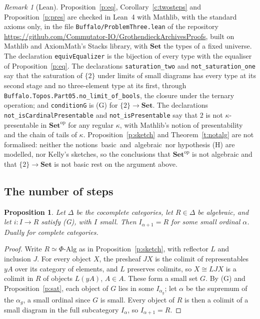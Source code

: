\documentclass[11pt,a4paper]{amsart}
\newtheorem{proposition}[theorem]{Proposition}
\theoremstyle{definition}
\theoremstyle{remark}
\newtheorem{remark}[theorem]{Remark}
\newcommand{\q}[1]{\guillemotleft\,#1\,\guillemotright}
\newcommand{\Set}{\mathbf{Set}}
\begin{document}
\begin{remark}[Lean]\label{r:lean}
Proposition~\ref{p:eq}, Corollary~\ref{c:twosteps} and Proposition~\ref{p:pres} are checked in Lean~4 with Mathlib, with the standard axioms only, in the file \texttt{Buffalo/\allowbreak ProblemThree.lean} of the repository \url{https://github.com/Commutator-IO/GrothendieckArchivesProofs}, built on Mathlib and AxiomMath's Stacks library, with $\Set$ the types of a fixed universe. The declaration \texttt{equivEqualizer} is the bijection of every type with the equaliser of Proposition~\ref{p:eq}. The declarations \texttt{saturation\_two} and \texttt{not\_saturation\_one} say that the saturation of $\{2\}$ under limits of small diagrams has every type at its second stage and no three-element type at its first, through \texttt{Buffalo.Topos.Part05.no\_limit\_of\_bools}, the closure under the ternary operation; and \texttt{conditionG} is (G) for $\{2\}\to\Set$. The declarations \texttt{not\_isCardinalPresentable} and \texttt{not\_isPresentable} say that $2$ is not $\kappa$-presentable in $\Set^{\mathrm{op}}$ for any regular $\kappa$, with Mathlib's notion of presentability and the chain of tails of $\kappa$. Proposition~\ref{p:sketch} and Theorem~\ref{t:notalg} are not formalised: neither the notions \q{basic} and \q{algebraic} nor hypothesis (H) are modelled, nor Kelly's sketches, so the conclusions that $\Set^{\mathrm{op}}$ is not algebraic and that $\{2\}\to\Set$ is not basic rest on the argument above.
\end{remark}

\subsection{The number of steps}

\begin{proposition}\label{p:bound}
Let $\Delta$ be the cocomplete categories, let $R\in\Delta$ be algebraic, and let $i\colon I\to R$ satisfy (G), with $I$ small. Then $I_{\alpha+1}=R$ for some small ordinal $\alpha$. Dually for complete categories.
\end{proposition}

\begin{proof}
Write $R\simeq\Phi\text{-}\mathrm{Alg}$ as in Proposition~\ref{p:sketch}, with reflector $L$ and inclusion $J$. For every object $X$, the presheaf $JX$ is the colimit of representables $yA$ over its category of elements, and $L$ preserves colimits, so $X\cong LJX$ is a colimit in $R$ of objects $L(yA)$, $A\in A$. These form a small set $G$. By (G) and Proposition~\ref{p:sat}, each object of $G$ lies in some $I_{\alpha_g}$; let $\alpha$ be the supremum of the $\alpha_g$, a small ordinal since $G$ is small. Every object of $R$ is then a colimit of a small diagram in the full subcategory $I_\alpha$, so $I_{\alpha+1}=R$.
\end{proof}
\end{document}
